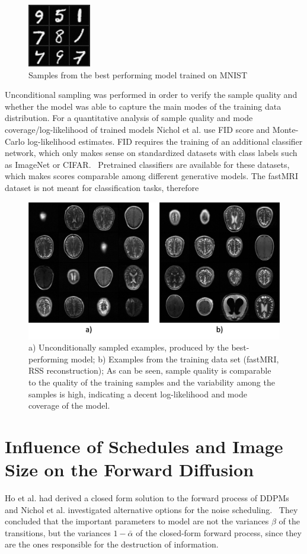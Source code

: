 \begin{figure}[h]
    \centering
    \includegraphics[width=.15\textwidth]{images/mnistsamples.png}
    \caption[Samples generated from MNIST]{Samples from the best performing model trained on MNIST}
    \label{fig:mnistsamples}
\end{figure}

Unconditional sampling was performed in order to verify the sample quality and whether the model was able to capture the main modes of the training data distribution. For a quantitative analysis of sample quality and mode coverage/log-likelihood of trained models Nichol et al. use FID score and Monte-Carlo log-likelihood estimates. FID requires the training of an additional classifier network, which only makes sense on standardized datasets with class labels such as ImageNet or CIFAR.~\autocite{imagenet, cifar} Pretrained classifiers are available for these datasets, which makes scores comparable among different generative models. The fastMRI dataset is not meant for classification tasks, therefore
\begin{figure}[h]
    \centering
    \includegraphics[width=.66\textwidth]{images/samples_unconditional.png}
    \caption[Samples from Data Set and Unconditional Sampling]{a) Unconditionally sampled examples, produced by the best-performing model; b) Examples from the training data set (fastMRI, RSS reconstruction); As can be seen, sample quality is comparable to the quality of the training samples and the variability among the samples is high, indicating a decent log-likelihood and mode coverage of the model.}
    \label{fig:uncondsampling}
\end{figure}

\section{Influence of Schedules and Image Size on the Forward Diffusion}
\label{sec:forward_diff_experiments}
Ho et al. had derived a closed form solution to the forward process of DDPMs and Nichol et al. investigated alternative options for the noise scheduling.~\autocite{ho2020denoising,nichol2021improved} They concluded that the important parameters to model are not the variances $\beta$ of the transitions, but the variances $1-\bar{\alpha}$ of the closed-form forward process, since they are the ones responsible for the destruction of information.

